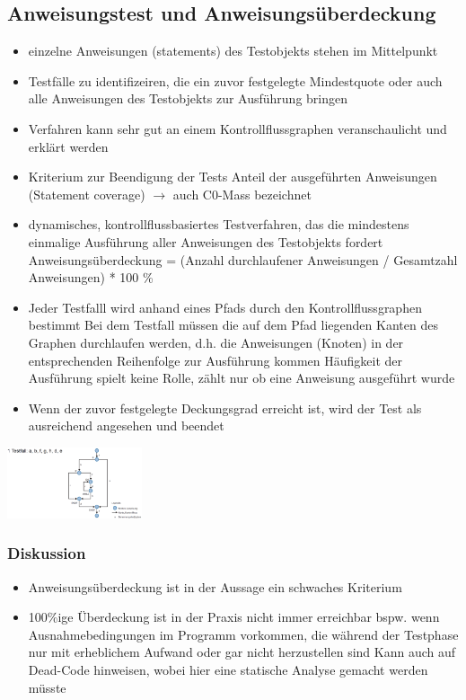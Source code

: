 \documentclass{report}
\newenvironment{Figure}
	{\par\medskip\noindent\minipage{\linewidth}}
	{\endminipage\par\medskip}
\theoremstyle{definition}
\theoremstyle{example}
\begin{document}
\subsection{Anweisungstest und Anweisungsüberdeckung}
\begin{itemize}
   \item einzelne Anweisungen (statements) des Testobjekts stehen im Mittelpunkt
   \item Testfälle zu identifizeiren, die ein zuvor festgelegte Mindestquote oder auch alle Anweisungen des Testobjekts zur Ausführung bringen
   \item Verfahren kann sehr gut an einem Kontrollflussgraphen veranschaulicht und erklärt werden
   \item Kriterium zur Beendigung der Tests
   \subitem Anteil der ausgeführten Anweisungen (Statement coverage) $\rightarrow$ auch C0-Mass bezeichnet 
   \item dynamisches, kontrollflussbasiertes Testverfahren, das die mindestens einmalige Ausführung aller Anweisungen des Testobjekts fordert
   \subitem Anweisungsüberdeckung = (Anzahl durchlaufener Anweisungen / Gesamtzahl Anweisungen) * 100 \%
   \item Jeder Testfalll wird anhand eines Pfads durch den Kontrollflussgraphen bestimmt
   \subitem Bei dem Testfall müssen die auf dem Pfad liegenden Kanten des Graphen durchlaufen werden, d.h. die Anweisungen (Knoten) in der entsprechenden Reihenfolge zur Ausführung kommen 
   \subitem Häufigkeit der Ausführung spielt keine Rolle, zählt nur ob eine Anweisung ausgeführt wurde 
   \item Wenn der zuvor festgelegte Deckungsgrad erreicht ist, wird der Test als ausreichend angesehen und beendet
\end{itemize}

\begin{Figure}
   \centering
    \includegraphics[width=150px]{img/Anweisungsueberdeckung.png}
        \label{fig:Beispiel Anweisungsueberdeckung}
    \end{Figure}

\subsubsection{Diskussion}
\begin{itemize}
   \item Anweisungsüberdeckung ist in der Aussage ein schwaches Kriterium
   \item 100\%ige Überdeckung ist in der Praxis nicht immer erreichbar
   \subitem bspw. wenn Ausnahmebedingungen im Programm vorkommen, die während der Testphase nur mit erheblichem Aufwand oder gar nicht herzustellen sind
   \subitem Kann auch auf Dead-Code hinweisen, wobei hier eine statische Analyse gemacht werden müsste
\end{itemize}
\end{document}
